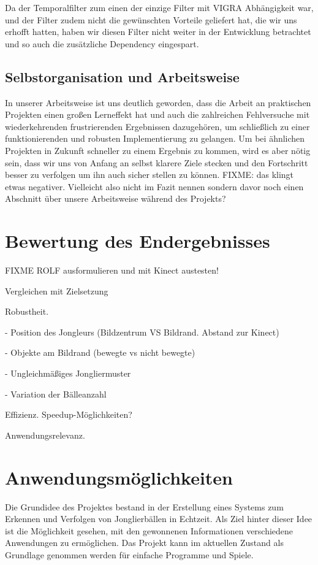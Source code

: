\documentclass[12pt,a4paper,ngerman]{scrartcl}
\begin{document}
Da der Temporalfilter zum einen der einzige Filter mit VIGRA Abhängigkeit war, und
der Filter zudem nicht die gewünschten Vorteile geliefert hat, die wir uns erhofft
hatten, haben wir diesen Filter nicht weiter in der Entwicklung betrachtet und so
auch die zusätzliche Dependency eingespart.

\subsection{Selbstorganisation und Arbeitsweise}

In unserer Arbeitsweise ist uns deutlich geworden, dass die Arbeit an praktischen
Projekten einen großen Lerneffekt hat und auch die zahlreichen Fehlversuche mit
wiederkehrenden frustrierenden Ergebnissen dazugehören, um schließlich zu einer
funktionierenden und robusten Implementierung zu gelangen. Um bei ähnlichen
Projekten in Zukunft schneller zu einem Ergebnis zu kommen, wird es aber nötig
sein, dass wir uns von Anfang an selbst klarere Ziele stecken und den Fortschritt
besser zu verfolgen um ihn auch sicher stellen zu können.
{\color{red}FIXME: das klingt etwas negativer. Vielleicht also nicht im Fazit nennen sondern davor noch einen Abschnitt über unsere Arbeitsweise während des Projekts?}

\section{Bewertung des Endergebnisses}

{\color{red} FIXME ROLF ausformulieren und mit Kinect austesten!}

Vergleichen mit Zielsetzung

Robustheit.

  - Position des Jongleurs (Bildzentrum VS Bildrand. Abstand zur Kinect)

  - Objekte am Bildrand (bewegte vs nicht bewegte)

  - Ungleichmäßiges Jongliermuster

  - Variation der Bälleanzahl

Effizienz. Speedup-Möglichkeiten?

Anwendungsrelevanz.

\section{Anwendungsmöglichkeiten}

Die Grundidee des Projektes bestand in der Erstellung eines Systems zum Erkennen und
Verfolgen von Jonglierbällen in Echtzeit. Als Ziel hinter dieser Idee ist die
Möglichkeit gesehen, mit den gewonnenen Informationen verschiedene Anwendungen zu
ermöglichen. Das Projekt kann im aktuellen Zustand als Grundlage genommen werden
für einfache Programme und Spiele.
\end{document}
